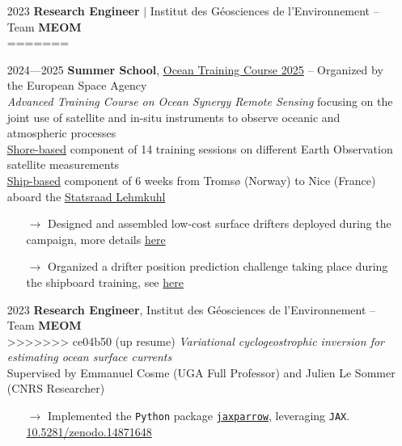 \documentclass{article}
\begin{document}
\begin{itemize}
    \item[] 2023 \tabto{2cm} \textbf{Research Engineer} $\vert$ Institut des Géosciences de l'Environnement – Team \textbf{MEOM} \\[.1 cm]
=======
    \item[] 2024—2025 \tabto{2cm} \textbf{Summer School}, \href{https://oceantrainingcourse2025.esa.int/}{Ocean Training Course 2025} – Organized by the European Space Agency \\[.1 cm]
    \tabto{2cm} \textit{Advanced Training Course on Ocean Synergy Remote Sensing} focusing on the joint use of satellite and \tabto{2cm} in-situ instruments to observe oceanic and atmospheric processes \\[.1 cm]
    \tabto{2cm} \underline{Shore-based} component of 14 training sessions on different Earth Observation satellite measurements \\[.1 cm]
    \tabto{2cm} \underline{Ship-based} component of 6 weeks from Tromsø (Norway) to Nice (France) aboard the \href{https://lehmkuhl.no/en/}{Statsraad Lehmkuhl}
    \vspace{-.4 cm}
    \begin{itemize}[left=2cm]
        \item[$\rightarrow$] Designed and assembled low-cost surface drifters deployed during the campaign, more details \href{https://github.com/vadmbertr/otc25-cannelloni}{here}
        \item[$\rightarrow$] Organized a drifter position prediction challenge taking place during the shipboard training, see \href{https://vadmbertr.github.io/otc25-virtual-drift/}{here}
    \end{itemize}

    \item[] 2023 \tabto{2cm} \textbf{Research Engineer}, Institut des Géosciences de l'Environnement – Team \textbf{MEOM} \\[.1 cm]
>>>>>>> ce04b50 (up resume)
    \tabto{2cm} \textit{Variational cyclogeostrophic inversion for estimating ocean surface currents} \\[.1 cm]
    \tabto{2cm} Supervised by Emmanuel Cosme (UGA Full Professor) and Julien Le Sommer (CNRS Researcher)
    \vspace{-.1 cm}
    \begin{itemize}[left=2cm]
        \item[$\rightarrow$] Implemented the \texttt{Python} package \href{https://github.com/meom-group/jaxparrow}{\texttt{jaxparrow}}, leveraging \texttt{JAX}. \href{https://doi.org/10.5281/zenodo.14871648}{10.5281/zenodo.14871648}
    \end{itemize}
    

\end{itemize}
\end{document}
